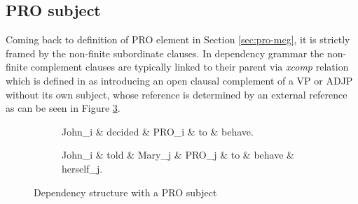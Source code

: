 \subsection{PRO subject}
Coming back to definition of PRO element in Section \ref{sec:pro-mcg}, it is strictly framed by the non-finite subordinate clauses. In dependency grammar the non-finite complement clauses are typically linked to their parent via \textit{xcomp} relation which is defined in \cite{Marneffe2008} as introducing an open clausal complement of a VP or ADJP without its own subject, whose reference is determined by an external reference as can be seen in Figure \ref{fig:xcomp-ex}.


\begin{figure}[!ht]
    \centering
    \begin{subfigure}[t]{0.45\linewidth}
        \begin{dependency}
            \begin{deptext}[]
                John_i \& decided \& PRO_i \& to \& behave.\\
            \end{deptext}
        \end{dependency}
        \caption{}
        \label{fig:xcomp-ex1}
    \end{subfigure}

    \begin{subfigure}[t]{0.45\linewidth}
        \begin{dependency}
            \begin{deptext}[]
                John_i \& told \& Mary_j \& PRO_j \& to \& behave \& herself_j. \\
            \end{deptext}
        \end{dependency}
        \caption{}
        \label{fig:xcomp-ex2}
    \end{subfigure}
    \caption{Dependency structure with a PRO subject}
    \label{fig:xcomp-ex}
\end{figure}

